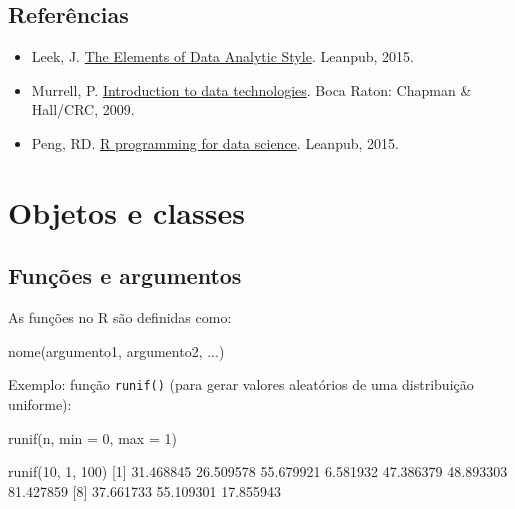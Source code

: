 \documentclass[
  10pt,
  a4paper]{book}
\newenvironment{Shaded}{\begin{snugshade}}{\end{snugshade}}
\newcommand{\AttributeTok}[1]{\textcolor[rgb]{0.77,0.63,0.00}{#1}}
\newcommand{\DecValTok}[1]{\textcolor[rgb]{0.00,0.00,0.81}{#1}}
\newcommand{\FloatTok}[1]{\textcolor[rgb]{0.00,0.00,0.81}{#1}}
\newcommand{\FunctionTok}[1]{\textcolor[rgb]{0.00,0.00,0.00}{#1}}
\newcommand{\NormalTok}[1]{#1}
\providecommand{\tightlist}{%
  \setlength{\itemsep}{0pt}\setlength{\parskip}{0pt}}
\begin{document}
\hypertarget{referuxeancias}{%
\section*{Referências}\label{referuxeancias}}


\begin{itemize}
\tightlist
\item
  Leek, J. \href{https://leanpub.com/datastyle}{The Elements of Data Analytic Style}. Leanpub, 2015.
\item
  Murrell,
  P. \href{https://www.stat.auckland.ac.nz/~paul/ItDT/HTML}{Introduction to data technologies}. Boca
  Raton: Chapman \& Hall/CRC, 2009.
\item
  Peng,
  RD. \href{https://leanpub.com/rprogramming}{R programming for data science}. Leanpub, 2015.
\end{itemize}

\hypertarget{objetos-e-classes}{%
\chapter{Objetos e classes}\label{objetos-e-classes}}

\hypertarget{funuxe7uxf5es-e-argumentos}{%
\section{Funções e argumentos}\label{funuxe7uxf5es-e-argumentos}}

As funções no R são definidas como:

\begin{Shaded}
\begin{Highlighting}[]
\FunctionTok{nome}\NormalTok{(argumento1, argumento2, ...)}
\end{Highlighting}
\end{Shaded}

Exemplo: função \texttt{runif()} (para gerar valores aleatórios de uma
distribuição uniforme):

\begin{Shaded}
\begin{Highlighting}[]
\FunctionTok{runif}\NormalTok{(n, }\AttributeTok{min =} \DecValTok{0}\NormalTok{, }\AttributeTok{max =} \DecValTok{1}\NormalTok{)}
\end{Highlighting}
\end{Shaded}

\begin{Shaded}
\begin{Highlighting}[]
\FunctionTok{runif}\NormalTok{(}\DecValTok{10}\NormalTok{, }\DecValTok{1}\NormalTok{, }\DecValTok{100}\NormalTok{)}
\NormalTok{ [}\DecValTok{1}\NormalTok{] }\FloatTok{31.468845} \FloatTok{26.509578} \FloatTok{55.679921}  \FloatTok{6.581932} \FloatTok{47.386379} \FloatTok{48.893303} \FloatTok{81.427859}
\NormalTok{ [}\DecValTok{8}\NormalTok{] }\FloatTok{37.661733} \FloatTok{55.109301} \FloatTok{17.855943}
\end{Highlighting}
\end{Shaded}
\end{document}
